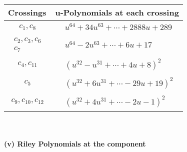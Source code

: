\documentclass[1p]{elsarticle_modified}
\theoremstyle{definition}
\begin{document}
\begin{tabular}{m{50pt}|m{274pt}}
Crossings & \hspace{64pt}u-Polynomials at each crossing \\
\hline $$\begin{aligned}c_{1},c_{8}\end{aligned}$$&$\begin{aligned}
&u^{64}+34 u^{63}+\cdots+2888 u+289
\end{aligned}$\\
\hline $$\begin{aligned}c_{2},c_{3},c_{6}\\c_{7}\end{aligned}$$&$\begin{aligned}
&u^{64}-2 u^{63}+\cdots+6 u+17
\end{aligned}$\\
\hline $$\begin{aligned}c_{4},c_{11}\end{aligned}$$&$\begin{aligned}
&(u^{32}- u^{31}+\cdots+4 u+8)^{2}
\end{aligned}$\\
\hline $$\begin{aligned}c_{5}\end{aligned}$$&$\begin{aligned}
&(u^{32}+6 u^{31}+\cdots-29 u+19)^{2}
\end{aligned}$\\
\hline $$\begin{aligned}c_{9},c_{10},c_{12}\end{aligned}$$&$\begin{aligned}
&(u^{32}+4 u^{31}+\cdots-2 u-1)^{2}
\end{aligned}$\\
\hline
\end{tabular}\\~\\
\newpage\renewcommand{\arraystretch}{1}
\flushleft \textbf{(v) Riley Polynomials at the component}\newline \\
\end{document}
